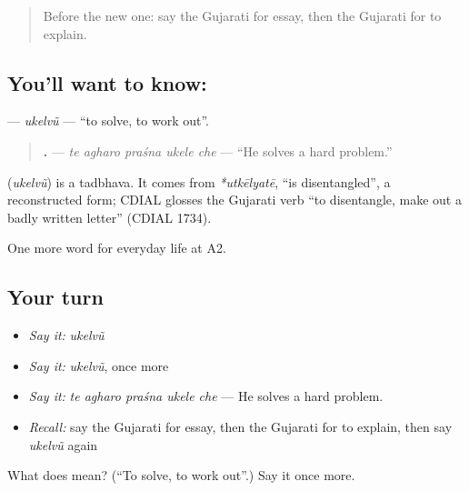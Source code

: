 \label{lesson:GU-C244-ukelvu}



\begin{quote}
Before the new one: say the Gujarati for essay, then the Gujarati for to explain.
\end{quote}

\subsection*{You'll want to know: }
\textbf{} — \emph{ukelvũ} — \textquotedblleft{}to solve, to work out\textquotedblright{}.

\begin{quote}
\textbf{    .} — \emph{te agharo praśna ukele che} — \textquotedblleft{}He solves a hard problem.\textquotedblright{}
\end{quote}

\begin{cousinweb}
\textbf{} (\emph{ukelvũ}) is a tadbhava. It comes from \emph{*utkēlyatē}, \textquotedblleft{}is disentangled\textquotedblright{}, a reconstructed form; CDIAL glosses the Gujarati verb \textquotedblleft{}to disentangle, make out a badly written letter\textquotedblright{} (CDIAL 1734).
\end{cousinweb}

\begin{grammarlens}[title={What you've built}]
One more word for everyday life at A2.
\end{grammarlens}

\subsection*{Your turn}
\begin{itemize}
\raggedright
  \item \emph{Say it:} \emph{ukelvũ}
  \item \emph{Say it:} \emph{ukelvũ}, once more
  \item \emph{Say it:} \emph{te agharo praśna ukele che} — He solves a hard problem.
  \item \emph{Recall:} say the Gujarati for essay, then the Gujarati for to explain, then say \emph{ukelvũ} again
\end{itemize}

\begin{tcolorbox}[breakable,colback=teal!4,colframe=teal!35!black,title={Before you move on}]
What does  mean? (\textquotedblleft{}To solve, to work out\textquotedblright{}.) Say it once more.
\end{tcolorbox}
